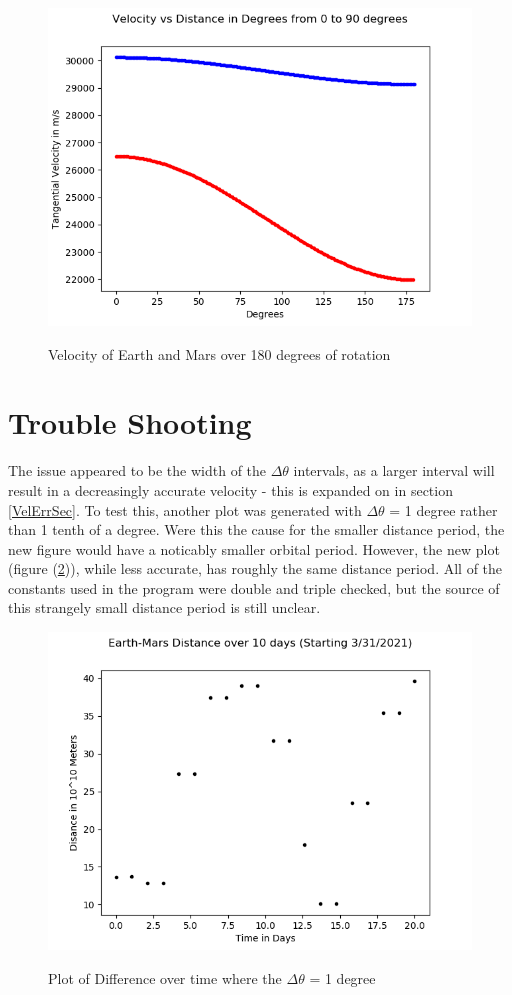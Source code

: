 \begin{figure}
	\includegraphics[scale = 0.8]{VelocityPlot.png}
	\label{VelocityPlt}
	\caption{Velocity of Earth and Mars over 180 degrees of rotation}
\end{figure}

\section{Trouble Shooting}
The issue appeared to be the width of the $\Delta\theta$ intervals, as a larger interval will result in a decreasingly
accurate velocity - this is expanded on in section \ref{VelErrSec}. To test this, another plot was generated with $\Delta\theta$ = 1 degree rather than 1 tenth of a degree. Were this the cause for the smaller distance period, the new
figure would have a noticably smaller orbital period. However, the new plot (figure (\ref{DiffPlot2})), while less 
accurate, has roughly the same distance period. All of the constants used in the program were double and triple 
checked, but the source of this strangely small distance period is still unclear.
\begin{figure}
	\includegraphics[scale = 0.8]{DistancePlot2.png}
	\label{DiffPlot2}
	\caption{Plot of Difference over time where the $\Delta\theta$ = 1 degree}
\end{figure}
